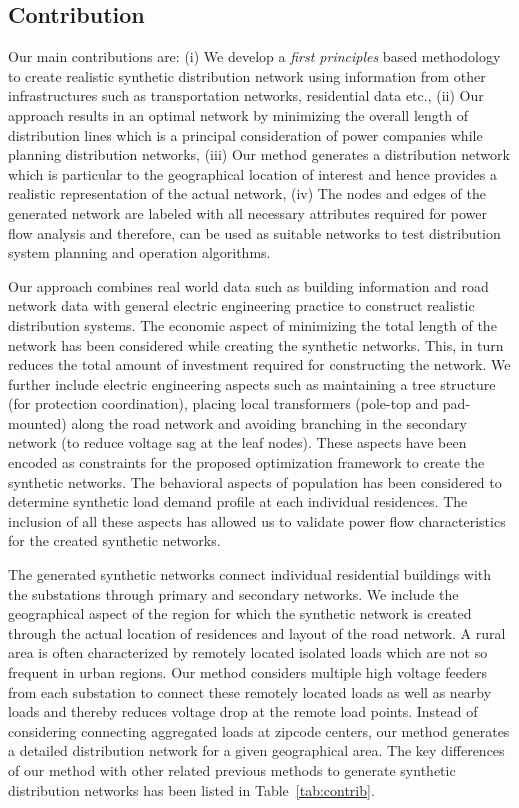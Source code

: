 \documentclass[sigconf]{acmart}
\begin{document}
\subsection{Contribution}\label{ssec:contri}
Our main contributions are: (i) We develop a \emph{first principles} based methodology to create realistic synthetic distribution network using information from other infrastructures such as transportation networks, residential data etc., (ii) Our approach results in an optimal network by minimizing the overall length of distribution lines which is a principal consideration of power companies while planning distribution networks, (iii) Our method generates a distribution network which is particular to the geographical location of interest and hence provides a realistic representation of the actual network, (iv) The nodes and edges of the generated network are labeled with all necessary attributes required for power flow analysis and therefore, can be used as suitable networks to test distribution system planning and operation algorithms. 

Our approach combines real world data such as building information and road network data with general electric engineering practice to construct realistic distribution systems. The economic aspect of minimizing the total length of the network has been considered while creating the synthetic networks. This, in turn reduces the total amount of investment required for constructing the network. We further include electric engineering aspects such as maintaining a tree structure (for protection coordination), placing local transformers (pole-top and pad-mounted) along the road network and avoiding branching in the secondary network (to reduce voltage sag at the leaf nodes). These aspects have been encoded as constraints for the proposed optimization framework to create the synthetic networks. The behavioral aspects of population has been considered to determine synthetic load demand profile at each individual residences. The inclusion of all these aspects has allowed us to validate power flow characteristics for the created synthetic networks.

The generated synthetic networks connect individual residential buildings with the substations through primary and secondary networks. We include the geographical aspect of the region for which the synthetic network is created through the actual location of residences and layout of the road network. A rural area is often characterized by remotely located isolated loads which are not so frequent in urban regions. Our method considers multiple high voltage feeders from each substation to connect these remotely located loads as well as nearby loads and thereby reduces voltage drop at the remote load points. Instead of considering connecting aggregated loads at zipcode centers, our method generates a detailed distribution network for a given geographical area. The key differences of our method with other related previous methods to generate synthetic distribution networks has been listed in Table~\ref{tab:contrib}.
\end{document}
